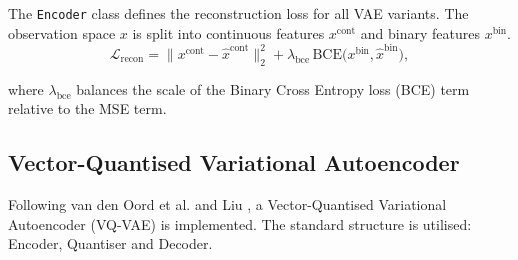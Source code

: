 The \lstinline[language=Python]|Encoder| class defines the reconstruction loss for all VAE variants.
The observation space $x$ is split into continuous features $x^\text{cont}$ and binary features $x^\text{bin}$.
\begin{equation}
    \mathcal{L}_\text{recon}
    = \|x^\text{cont} - \hat{x}^\text{cont}\|_2^2
    + \lambda_\text{bce} \,\mathrm{BCE}\!\big(x^\text{bin}, \hat{x}^\text{bin}\big),
    \label{eq:recon}
\end{equation}

where $\lambda_\text{bce}$ balances the scale of the Binary Cross Entropy loss (BCE) term relative to the MSE term.

\subsection{Vector-Quantised Variational Autoencoder}
\label{sec:3.5.2}

Following van den Oord et al. \cite{VQVAE} and Liu \cite{AIMotherTongue}, a Vector-Quantised Variational Autoencoder (VQ-VAE) is implemented.
The standard structure is utilised: Encoder, Quantiser and Decoder.





